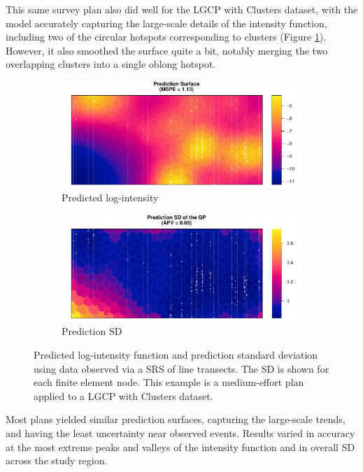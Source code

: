 \documentclass[review]{elsarticle}
\begin{document}
This same survey plan also did well for the LGCP with Clusters dataset, with
the model accurately capturing the large-scale details of the intensity
function, including two of the circular hotspots corresponding to clusters
(Figure \ref{lambdasrs000187clust}). However, it also smoothed the surface
quite a bit, notably merging the two overlapping clusters into a single oblong
hotspot.

\begin{figure}

\begin{subfigure}{5in}
\includegraphics[width=5in]{../graphics/lambda-SRS000187-Cluster000004.pdf}
\caption{Predicted log-intensity}
\label{lambdasrs000187clust}
\end{subfigure}

\begin{subfigure}{5in}
\includegraphics[width=5in]{../graphics/lambdaSD-SRS000187-Cluster000004.pdf}
\caption{Prediction SD}
\label{sdsrs000187clust}
\end{subfigure}

\caption{Predicted log-intensity function and prediction standard deviation
using data observed via a SRS of line transects. The SD is shown for each
finite element node. This example is a medium-effort plan applied to a
LGCP with Clusters dataset.}
\label{srs000187clust}
\end{figure}

Most plans yielded similar prediction surfaces, capturing the large-scale
trends, and having the least uncertainty near observed events. Results varied
in accuracy at the most extreme peaks and valleys of the intensity function and
in overall SD across the study region.
\end{document}
